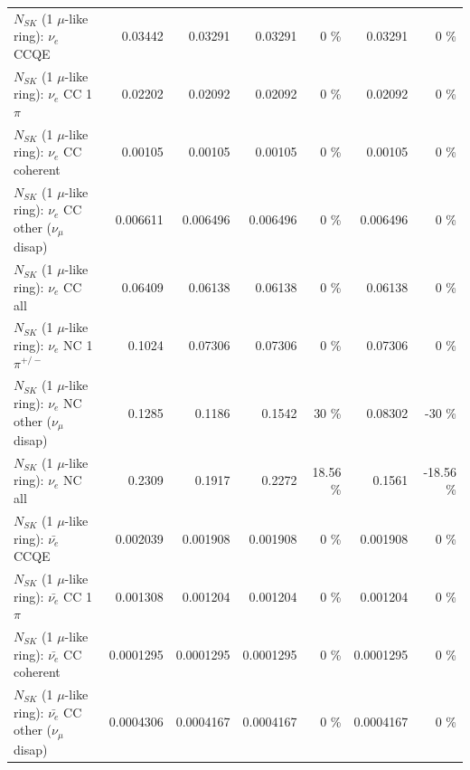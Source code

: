 \begin{table}
\begin{tabular}{| l | r | r | r  r | r  r |}
\hline
\hline
\hline
                                      $N_{SK}$ (1 $\mu$-like ring): $\nu_e$ CCQE &         0.03442 &         0.03291 &         0.03291 &        0 \%  &         0.03291 &        0 \%  \\ 
                                 $N_{SK}$ (1 $\mu$-like ring): $\nu_e$ CC 1$\pi$ &         0.02202 &         0.02092 &         0.02092 &        0 \%  &         0.02092 &        0 \%  \\ 
                               $N_{SK}$ (1 $\mu$-like ring): $\nu_e$ CC coherent &         0.00105 &         0.00105 &         0.00105 &        0 \%  &         0.00105 &        0 \%  \\ 
                $N_{SK}$ (1 $\mu$-like ring): $\nu_e$ CC other ($\nu_\mu$ disap) &        0.006611 &        0.006496 &        0.006496 &        0 \%  &        0.006496 &        0 \%  \\ 
                                  $N_{SK}$ (1 $\mu$-like ring): $\nu_{e}$ CC all &         0.06409 &         0.06138 &         0.06138 &        0 \%  &         0.06138 &        0 \%  \\ 
\hline
                           $N_{SK}$ (1 $\mu$-like ring): $\nu_e$ NC 1$\pi^{+/-}$ &          0.1024 &         0.07306 &         0.07306 &        0 \%  &         0.07306 &        0 \%  \\ 
                $N_{SK}$ (1 $\mu$-like ring): $\nu_e$ NC other ($\nu_\mu$ disap) &          0.1285 &          0.1186 &          0.1542 &       30 \%  &         0.08302 &      -30 \%  \\ 
                                  $N_{SK}$ (1 $\mu$-like ring): $\nu_{e}$ NC all &          0.2309 &          0.1917 &          0.2272 &    18.56 \%  &          0.1561 &   -18.56 \%  \\ 
\hline
\hline
\hline
                                $N_{SK}$ (1 $\mu$-like ring): $\bar{\nu_e}$ CCQE &        0.002039 &        0.001908 &        0.001908 &        0 \%  &        0.001908 &        0 \%  \\ 
                           $N_{SK}$ (1 $\mu$-like ring): $\bar{\nu_e}$ CC 1$\pi$ &        0.001308 &        0.001204 &        0.001204 &        0 \%  &        0.001204 &        0 \%  \\ 
                         $N_{SK}$ (1 $\mu$-like ring): $\bar{\nu_e}$ CC coherent &       0.0001295 &       0.0001295 &       0.0001295 &        0 \%  &       0.0001295 &        0 \%  \\ 
          $N_{SK}$ (1 $\mu$-like ring): $\bar{\nu_e}$ CC other ($\nu_\mu$ disap) &       0.0004306 &       0.0004167 &       0.0004167 &        0 \%  &       0.0004167 &        0 \%  \\ 

\end{tabular}
\end{table}

